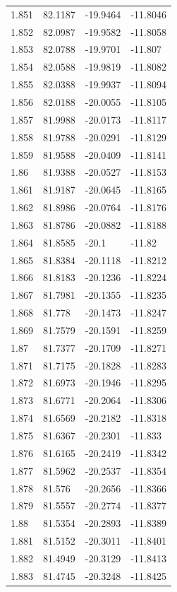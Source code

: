 \begin{tabular}{llll}
1.851 & 82.1187 & -19.9464 & -11.8046 \\
1.852 & 82.0987 & -19.9582 & -11.8058 \\
1.853 & 82.0788 & -19.9701 & -11.807 \\
1.854 & 82.0588 & -19.9819 & -11.8082 \\
1.855 & 82.0388 & -19.9937 & -11.8094 \\
1.856 & 82.0188 & -20.0055 & -11.8105 \\
1.857 & 81.9988 & -20.0173 & -11.8117 \\
1.858 & 81.9788 & -20.0291 & -11.8129 \\
1.859 & 81.9588 & -20.0409 & -11.8141 \\
1.86 & 81.9388 & -20.0527 & -11.8153 \\
1.861 & 81.9187 & -20.0645 & -11.8165 \\
1.862 & 81.8986 & -20.0764 & -11.8176 \\
1.863 & 81.8786 & -20.0882 & -11.8188 \\
1.864 & 81.8585 & -20.1 & -11.82 \\
1.865 & 81.8384 & -20.1118 & -11.8212 \\
1.866 & 81.8183 & -20.1236 & -11.8224 \\
1.867 & 81.7981 & -20.1355 & -11.8235 \\
1.868 & 81.778 & -20.1473 & -11.8247 \\
1.869 & 81.7579 & -20.1591 & -11.8259 \\
1.87 & 81.7377 & -20.1709 & -11.8271 \\
1.871 & 81.7175 & -20.1828 & -11.8283 \\
1.872 & 81.6973 & -20.1946 & -11.8295 \\
1.873 & 81.6771 & -20.2064 & -11.8306 \\
1.874 & 81.6569 & -20.2182 & -11.8318 \\
1.875 & 81.6367 & -20.2301 & -11.833 \\
1.876 & 81.6165 & -20.2419 & -11.8342 \\
1.877 & 81.5962 & -20.2537 & -11.8354 \\
1.878 & 81.576 & -20.2656 & -11.8366 \\
1.879 & 81.5557 & -20.2774 & -11.8377 \\
1.88 & 81.5354 & -20.2893 & -11.8389 \\
1.881 & 81.5152 & -20.3011 & -11.8401 \\
1.882 & 81.4949 & -20.3129 & -11.8413 \\
1.883 & 81.4745 & -20.3248 & -11.8425 \\

\end{tabular}
